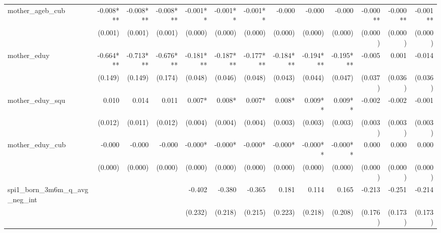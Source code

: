\begin{tabular}{lrrrrrrrrrrrr}
mother\_ageb\_cub                           &    -0.008*** &    -0.008*** &    -0.008*** &     -0.001** &     -0.001** &     -0.001** &       -0.000 &       -0.000 &       -0.000 &     -0.000** &     -0.000** &     -0.001** \\ 
                                            &      (0.001) &      (0.001) &      (0.001) &      (0.000) &      (0.000) &      (0.000) &      (0.000) &      (0.000) &      (0.000) &      (0.000) &      (0.000) &      (0.000) \\ 
mother\_eduy                                &    -0.664*** &    -0.713*** &    -0.676*** &    -0.181*** &    -0.187*** &    -0.177*** &    -0.184*** &    -0.194*** &    -0.195*** &       -0.005 &        0.001 &       -0.014 \\ 
                                            &      (0.149) &      (0.149) &      (0.174) &      (0.048) &      (0.046) &      (0.048) &      (0.043) &      (0.044) &      (0.047) &      (0.037) &      (0.036) &      (0.036) \\ 
mother\_eduy\_squ                           &        0.010 &        0.014 &        0.011 &       0.007* &       0.008* &       0.007* &       0.008* &      0.009** &      0.009** &       -0.002 &       -0.002 &       -0.001 \\ 
                                            &      (0.012) &      (0.011) &      (0.012) &      (0.004) &      (0.004) &      (0.004) &      (0.003) &      (0.003) &      (0.003) &      (0.003) &      (0.003) &      (0.003) \\ 
mother\_eduy\_cub                           &       -0.000 &       -0.000 &       -0.000 &      -0.000* &      -0.000* &      -0.000* &      -0.000* &     -0.000** &     -0.000** &        0.000 &        0.000 &        0.000 \\ 
                                            &      (0.000) &      (0.000) &      (0.000) &      (0.000) &      (0.000) &      (0.000) &      (0.000) &      (0.000) &      (0.000) &      (0.000) &      (0.000) &      (0.000) \\ 
spi1\_born\_3m6m\_q\_avg\_neg\_int          &              &              &              &       -0.402 &       -0.380 &       -0.365 &        0.181 &        0.114 &        0.165 &       -0.213 &       -0.251 &       -0.214 \\ 
                                            &              &              &              &      (0.232) &      (0.218) &      (0.215) &      (0.223) &      (0.218) &      (0.208) &      (0.176) &      (0.173) &      (0.173) \\ 

\end{tabular}
